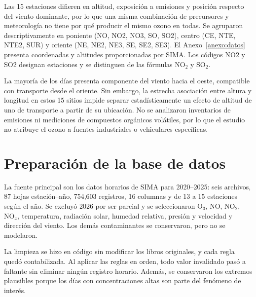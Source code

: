 \documentclass[11pt,letterpaper]{article}
\newcommand{\NOx}{NO$_x$}
\begin{document}
Las 15 estaciones difieren en altitud, exposición a emisiones y posición respecto del viento dominante, por lo que una misma combinación de precursores y meteorología no tiene por qué producir el mismo ozono en todas. Se agruparon descriptivamente en poniente (NO, NO2, NO3, SO, SO2), centro (CE, NTE, NTE2, SUR) y oriente (NE, NE2, NE3, SE, SE2, SE3). El Anexo~\ref{anexo:datos} presenta coordenadas y altitudes proporcionadas por SIMA. Los códigos NO2 y SO2 designan estaciones y se distinguen de las fórmulas NO$_2$ y SO$_2$.

La mayoría de los días presenta componente del viento hacia el oeste, compatible con transporte desde el oriente. Sin embargo, la estrecha asociación entre altura y longitud en estos 15 sitios impide separar estadísticamente un efecto de altitud de uno de transporte a partir de su ubicación. No se analizaron inventarios de emisiones ni mediciones de compuestos orgánicos volátiles, por lo que el estudio no atribuye el ozono a fuentes industriales o vehiculares específicas.

\clearpage

\section{Preparación de la base de datos}
La fuente principal son los datos horarios de SIMA para 2020--2025: seis archivos, 87 hojas estación--año, 754,603 registros, 16 columnas y de 13 a 15 estaciones según el año. Se excluyó 2026 por ser parcial y se seleccionaron O$_3$, NO, NO$_2$, \NOx, temperatura, radiación solar, humedad relativa, presión y velocidad y dirección del viento. Los demás contaminantes se conservaron, pero no se modelaron.

La limpieza se hizo en código sin modificar los libros originales, y cada regla quedó contabilizada. Al aplicar las reglas en orden, todo valor invalidado pasó a faltante sin eliminar ningún registro horario. Además, se conservaron los extremos plausibles porque los días con concentraciones altas son parte del fenómeno de interés.
\end{document}

